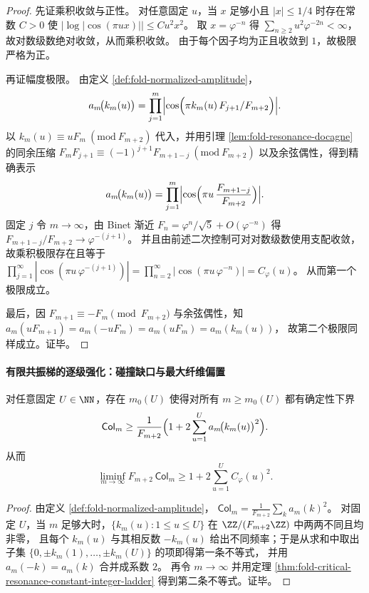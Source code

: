\begin{proof}
先证乘积收敛与正性。
对任意固定 \(u\)，当 \(x\) 足够小且 \(|x|\le 1/4\) 时存在常数 \(C>0\) 使
\(
|\log|\cos(\pi u x)||\le C u^2 x^2
\)。
取 \(x=\varphi^{-n}\) 得
\(
\sum_{n\ge 2}u^2\varphi^{-2n}<\infty
\)，
故对数级数绝对收敛，从而乘积收敛。
由于每个因子均为正且收敛到 \(1\)，故极限严格为正。
\par
再证幅度极限。
由定义 \ref{def:fold-normalized-amplitude}，
\[
a_m\!\bigl(k_m(u)\bigr)
=\prod_{j=1}^{m}\Bigl|\cos\Bigl(\pi k_m(u)\,F_{j+1}/F_{m+2}\Bigr)\Bigr|.
\]
以 \(k_m(u)\equiv uF_m\ (\mathrm{mod}\ F_{m+2})\) 代入，并用引理 \ref{lem:fold-resonance-docagne} 的同余压缩
\(
F_mF_{j+1}\equiv (-1)^{j+1}F_{m+1-j}\ (\mathrm{mod}\ F_{m+2})
\)
以及余弦偶性，得到精确表示
\[
a_m\!\bigl(k_m(u)\bigr)
=\prod_{j=1}^{m}\Bigl|\cos\Bigl(\pi u\,\frac{F_{m+1-j}}{F_{m+2}}\Bigr)\Bigr|.
\]
固定 \(j\) 令 \(m\to\infty\)，由 Binet 渐近 \(F_n=\varphi^n/\sqrt 5+O(\varphi^{-n})\) 得
\(
F_{m+1-j}/F_{m+2}\to \varphi^{-(j+1)}
\)。
并且由前述二次控制可对对数级数使用支配收敛，故乘积极限存在且等于
\(
\prod_{j=1}^{\infty}|\cos(\pi u\,\varphi^{-(j+1)})|
=\prod_{n=2}^{\infty}|\cos(\pi u\,\varphi^{-n})|
=C_\varphi(u)
\)。
从而第一个极限成立。
\par
最后，因 \(F_{m+1}\equiv -F_m\pmod{F_{m+2}}\) 与余弦偶性，知
\(
a_m(uF_{m+1})=a_m(-uF_m)=a_m(uF_m)=a_m(k_m(u))
\)，
故第二个极限同样成立。证毕。
\end{proof}

\paragraph{有限共振梯的逐级强化：碰撞缺口与最大纤维偏置}
\begin{corollary}[有限共振梯强化的碰撞缺口下界]\label{cor:fold-collision-gap-resonance-ladder-U}
对任意固定 \(U\in\NN\)，存在 \(m_0(U)\) 使得对所有 \(m\ge m_0(U)\) 都有确定性下界
\[
\mathsf{Col}_m
\ge
\frac{1}{F_{m+2}}
\Bigl(1+2\sum_{u=1}^{U}a_m\!\bigl(k_m(u)\bigr)^2\Bigr).
\]
从而
\[
\liminf_{m\to\infty}F_{m+2}\,\mathsf{Col}_m
\ge
1+2\sum_{u=1}^{U}C_\varphi(u)^2.
\]
\end{corollary}

\begin{proof}
由定义 \ref{def:fold-normalized-amplitude}，
\(
\mathsf{Col}_m=\frac{1}{F_{m+2}}\sum_{k}a_m(k)^2
\)。
对固定 \(U\)，当 \(m\) 足够大时，\(\{k_m(u):1\le u\le U\}\) 在 \(\ZZ/(F_{m+2}\ZZ)\) 中两两不同且均非零，
且每个 \(k_m(u)\) 与其相反数 \(-k_m(u)\) 给出不同频率；于是从求和中取出子集 \(\{0,\pm k_m(1),\dots,\pm k_m(U)\}\) 的项即得第一条不等式，
并用 \(a_m(-k)=a_m(k)\) 合并成系数 \(2\)。
再令 \(m\to\infty\) 并用定理 \ref{thm:fold-critical-resonance-constant-integer-ladder} 得到第二条不等式。证毕。
\end{proof}

